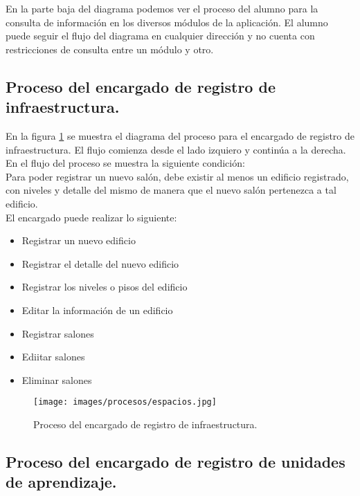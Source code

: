 En la parte baja del diagrama podemos ver el proceso del alumno para la consulta de información en los diversos módulos de la aplicación. El alumno puede seguir el flujo del diagrama en cualquier dirección y no cuenta con restricciones de consulta entre un módulo y otro.

\subsection{Proceso del encargado de registro de infraestructura.}

En la figura \ref{fig:espacios} se muestra el diagrama del proceso para el encargado de registro de infraestructura. El flujo comienza desde el lado izquiero y continúa a la derecha. \\

En el flujo del proceso se muestra la siguiente condición: \\
Para poder registrar un nuevo salón, debe existir al menos un edificio registrado, con niveles y detalle del mismo de manera que el nuevo salón pertenezca a tal edificio. \\

El encargado puede realizar lo siguiente:

\begin{itemize}
	\item Registrar un nuevo edificio
	\item Registrar el detalle del nuevo edificio
	\item Registrar los niveles o pisos del edificio
	\item Editar la información de un edificio
	\item Registrar salones
	\item Ediitar salones
	\item Eliminar salones
\end{itemize}

\begin{figure}[h!]
	\begin{center}
		\texttt{[image: images/procesos/espacios.jpg]}
		\caption{Proceso del encargado de registro de infraestructura.}
		\label{fig:espacios}
	\end{center}
\end{figure}

\subsection{Proceso del encargado de registro de unidades de aprendizaje.}

